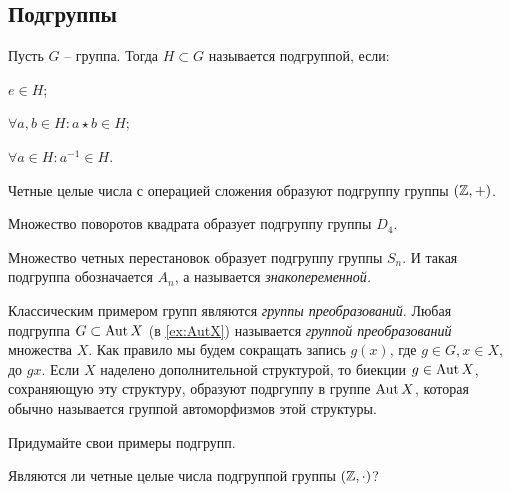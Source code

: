 \subsection{Подгруппы}
\begin{definition}
    [Подгруппа]
    Пусть $G$ -- группа. Тогда $H \subset G$ называется подгруппой, если:
    \begin{conditions}
    \item $e \in H$;
    \item $\forall a, b \in H: a \star b \in H$;
    \item $\forall a \in H: a^{-1} \in H$.
    \end{conditions}
\end{definition}

\begin{example}
    Четные целые числа с операцией сложения образуют подгруппу группы $(\mathbb Z, +)$.
\end{example}
\begin{example}
    Множество поворотов квадрата образует подгруппу группы $D_4$.
\end{example}
\begin{example}
    Множество четных перестановок образует подгруппу группы $S_n$. 
    И такая подгруппа обозначается $A_n$, а называется \emph{знакопеременной.}
\end{example}
\begin{example}
    Классическим примером групп являются \emph{группы преобразований}. Любая подгруппа $G \subset \operatorname{Aut} X$ (в \cref{ex:AutX}) называется \emph{группой преобразований} множества $X$. Как правило мы будем сокращать запись $g(x)$, где $g \in G, x \in X$, до $gx$. Если $X$ наделено дополнительной структурой, то биекции $g \in \operatorname{Aut} X$, сохраняющую эту структуру, образуют подргуппу в группе $\operatorname{Aut} X$, которая обычно называется группой автоморфизмов этой структуры.
\end{example}
\begin{practice}
    Придумайте свои примеры подгрупп.
\end{practice}
\begin{practice}
    Являются ли четные целые числа подгруппой группы $(\mathbb Z, \cdot)$?
\end{practice}

